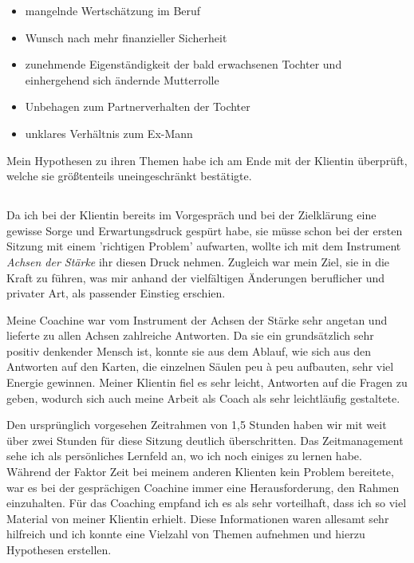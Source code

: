 \documentclass[11pt,a4paper]{article}
\begin{document}
\begin{itemize}

	\item mangelnde Wertschätzung im Beruf
	
	\item Wunsch nach mehr finanzieller Sicherheit
	
	\item zunehmende Eigenständigkeit der bald erwachsenen Tochter und einhergehend sich ändernde Mutterrolle
	
	\item Unbehagen zum Partnerverhalten der Tochter
	
	\item unklares Verhältnis zum Ex-Mann

\end{itemize}


Mein Hypothesen zu ihren Themen habe ich am Ende mit der Klientin überprüft, welche sie größtenteils uneingeschränkt bestätigte.


\subsection*{\color{Orange}{Erste Sitzung: Achsen der Stärke}}


Da ich bei der Klientin bereits im Vorgespräch und bei der Zielklärung eine gewisse Sorge und Erwartungsdruck gespürt habe, sie müsse schon bei der ersten Sitzung mit einem 'richtigen Problem' aufwarten, wollte ich mit dem Instrument \textsl{Achsen der Stärke} ihr diesen Druck nehmen. Zugleich war mein Ziel, sie in die Kraft zu führen, was mir anhand der vielfältigen Änderungen beruflicher und privater Art, als passender Einstieg erschien. 

Meine Coachine war vom Instrument der Achsen der Stärke sehr angetan und lieferte zu allen Achsen zahlreiche Antworten. Da sie ein grundsätzlich sehr positiv denkender Mensch ist, konnte sie aus dem Ablauf, wie sich aus den Antworten auf den Karten, die einzelnen Säulen peu à peu aufbauten, sehr viel Energie gewinnen. Meiner Klientin fiel es sehr leicht, Antworten auf die Fragen zu geben, wodurch sich auch meine Arbeit als Coach als sehr leichtläufig gestaltete.

Den ursprünglich vorgesehen Zeitrahmen von 1,5 Stunden haben wir mit weit über zwei Stunden für diese Sitzung deutlich überschritten. Das Zeitmanagement sehe ich als persönliches Lernfeld an, wo ich noch einiges zu lernen habe. Während der Faktor Zeit bei meinem anderen Klienten kein Problem bereitete, war es bei der gesprächigen Coachine immer eine Herausforderung, den Rahmen einzuhalten. Für das Coaching empfand ich es als sehr vorteilhaft, dass ich so viel Material von meiner Klientin erhielt. Diese Informationen waren allesamt sehr hilfreich und ich konnte eine Vielzahl von Themen aufnehmen und hierzu Hypothesen erstellen. 
\end{document}
